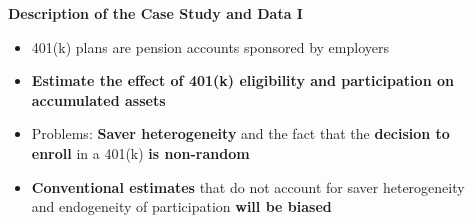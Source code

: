 \begin{frame}[fragile]
\begin{columns}
\begin{column}{0.3\textwidth}
\end{column}
\begin{column}{0.7\textwidth}
\textbf{Description of the Case Study and Data I}
\begin{itemize}
\small
\item 401(k) plans are pension accounts sponsored by employers
\item \textbf{Estimate the effect of 401(k) eligibility and participation on accumulated assets}
\item Problems: \textbf{Saver heterogeneity} and the fact that the \textbf{decision to enroll} in a 401(k) \textbf{is non-random}
\item \textbf{Conventional estimates} that do not account for saver heterogeneity and endogeneity of participation \textbf{will be biased}
\end{itemize}
\end{column}
\end{columns}
\end{frame}

